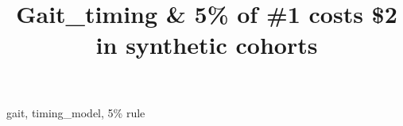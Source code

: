 \documentclass{IEEEtran}
\title{Gait\_timing \& 5\% of \#1 costs \$2 in synthetic cohorts}
\author{\IEEEauthorblockN{Ada Synthetic}\IEEEauthorblockA{Synthetic Institute} \and \IEEEauthorblockN{Ben Invented}\IEEEauthorblockA{Synthetic Institute\\Invented Clinic}}
\begin{document}
\maketitle
\begin{abstract}

\end{abstract}
\begin{IEEEkeywords}
gait, timing\_model, 5\% rule
\end{IEEEkeywords}






\end{document}
